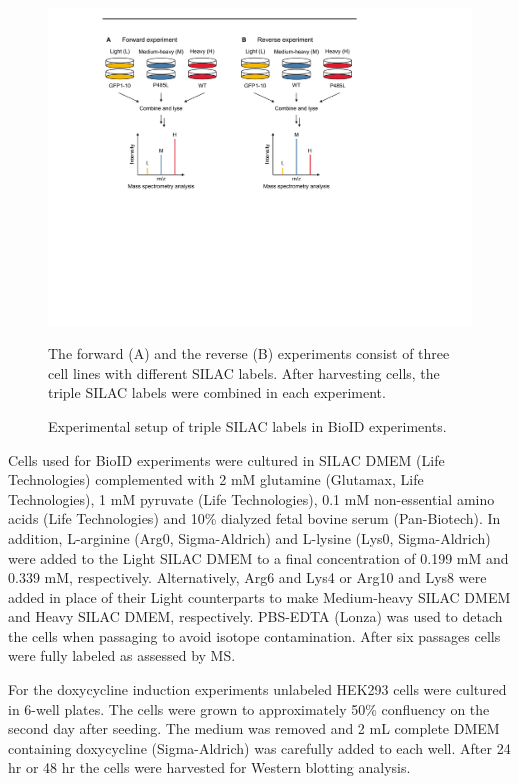 \begin{figure}[h]
\centering
\includegraphics[scale=0.7]{Figures/BioID}
\caption{Experimental setup of triple SILAC labels in BioID experiments.}
\vspace*{-3mm}
\small \justify
The forward (A) and the reverse (B) experiments consist of three cell lines with different SILAC labels. After harvesting cells, the triple SILAC labels were combined in each experiment.
\label{fig:bioid}
\end{figure}
Cells used for BioID experiments were cultured in SILAC DMEM (Life Technologies) complemented with 2 mM glutamine (Glutamax, Life Technologies), 1 mM pyruvate (Life Technologies), 0.1 mM non-essential amino acids (Life Technologies) and 10\% dialyzed fetal bovine serum (Pan-Biotech). In addition, L-arginine (Arg0, Sigma-Aldrich) and L-lysine (Lys0, Sigma-Aldrich) were added to the Light SILAC DMEM to a final concentration of 0.199 mM and 0.339 mM, respectively. Alternatively, Arg6 and Lys4 or Arg10 and Lys8 were added in place of their Light counterparts to make Medium-heavy SILAC DMEM and Heavy SILAC DMEM, respectively. PBS-EDTA (Lonza) was used to detach the cells when passaging to avoid isotope contamination. After six passages cells were fully labeled as assessed by MS.

For the doxycycline induction experiments unlabeled HEK293 cells were cultured in 6-well plates. The cells were grown to approximately 50\% confluency on the second day after seeding. The medium was removed and 2 mL complete DMEM containing doxycycline (Sigma-Aldrich) was carefully added to each well. After 24 hr or 48 hr the cells were harvested for Western blotting analysis.

